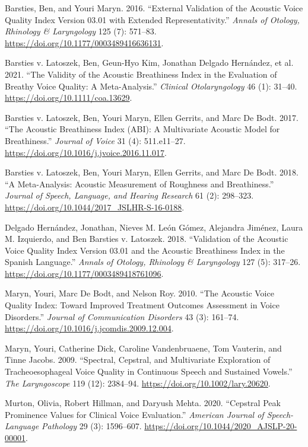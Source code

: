 \documentclass[
  english,
  letterpaper,
]{scrbook}
\newlength{\cslhangindent}
\newenvironment{CSLReferences}[2] %
 {\begin{list}{}{%
  \setlength{\itemindent}{0pt}
  \setlength{\leftmargin}{0pt}
  \setlength{\parsep}{0pt}
  \ifodd #1
   \setlength{\leftmargin}{\cslhangindent}
   \setlength{\itemindent}{-1\cslhangindent}
  \fi
  \setlength{\itemsep}{#2\baselineskip}}}
 {\end{list}}
\begin{document}
\protect{}\label{refs}
\begin{CSLReferences}{1}{1}
Barsties, Ben, and Youri Maryn. 2016. {``External Validation of the
{Acoustic} {Voice} {Quality} {Index} Version 03.01 with Extended
Representativity.''} \emph{Annals of Otology, Rhinology \& Laryngology}
125 (7): 571--83. \url{https://doi.org/10.1177/0003489416636131}.

Barsties v. Latoszek, Ben, Geun-Hyo Kim, Jonathan Delgado Hernández, et
al. 2021. {``The Validity of the {Acoustic} {Breathiness} {Index} in the
Evaluation of Breathy Voice Quality: A Meta-Analysis.''} \emph{Clinical
Otolaryngology} 46 (1): 31--40. \url{https://doi.org/10.1111/coa.13629}.

Barsties v. Latoszek, Ben, Youri Maryn, Ellen Gerrits, and Marc De Bodt.
2017. {``The {Acoustic} {Breathiness} {Index} ({ABI}): A Multivariate
Acoustic Model for Breathiness.''} \emph{Journal of Voice} 31 (4):
511.e11--27. \url{https://doi.org/10.1016/j.jvoice.2016.11.017}.

Barsties v. Latoszek, Ben, Youri Maryn, Ellen Gerrits, and Marc De Bodt.
2018. {``A Meta-Analysis: Acoustic Measurement of Roughness and
Breathiness.''} \emph{Journal of Speech, Language, and Hearing Research}
61 (2): 298--323. \url{https://doi.org/10.1044/2017_JSLHR-S-16-0188}.

Delgado Hernández, Jonathan, Nieves M. León Gómez, Alejandra Jiménez,
Laura M. Izquierdo, and Ben Barsties v. Latoszek. 2018. {``Validation of
the {Acoustic} {Voice} {Quality} {Index} Version 03.01 and the
{Acoustic} {Breathiness} {Index} in the {Spanish} Language.''}
\emph{Annals of Otology, Rhinology \& Laryngology} 127 (5): 317--26.
\url{https://doi.org/10.1177/0003489418761096}.

Maryn, Youri, Marc De Bodt, and Nelson Roy. 2010. {``The {Acoustic}
{Voice} {Quality} {Index}: Toward Improved Treatment Outcomes Assessment
in Voice Disorders.''} \emph{Journal of Communication Disorders} 43 (3):
161--74. \url{https://doi.org/10.1016/j.jcomdis.2009.12.004}.

Maryn, Youri, Catherine Dick, Caroline Vandenbruaene, Tom Vauterin, and
Tinne Jacobs. 2009. {``Spectral, Cepstral, and Multivariate Exploration
of Tracheoesophageal Voice Quality in Continuous Speech and Sustained
Vowels.''} \emph{The Laryngoscope} 119 (12): 2384--94.
\url{https://doi.org/10.1002/lary.20620}.

Murton, Olivia, Robert Hillman, and Daryush Mehta. 2020. {``Cepstral
Peak Prominence Values for Clinical Voice Evaluation.''} \emph{American
Journal of Speech-Language Pathology} 29 (3): 1596--607.
\url{https://doi.org/10.1044/2020_AJSLP-20-00001}.

\end{CSLReferences}


\backmatter
\end{document}
